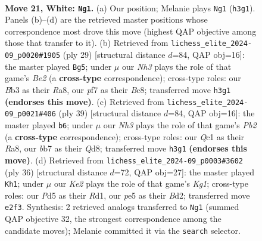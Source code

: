 \documentclass[11pt]{article}
\begin{document}
\begin{figure}[p]
\label{fig:thought-m38}
\end{figure}

\clearpage

\begin{figure}[p]\centering
\begin{subfigure}{0.46\textwidth}\centering
\resizebox{\linewidth}{!}{%
\newchessgame
\chessboard[
  setfen={2r3k1/1bqn1p1p/r4bp1/pppPp1B1/4P3/1BP3PN/P3KP1P/R1Q4R w - - 6 21},
  showmover=false,
  pgfstyle=straightmove, color=movearrow, markmove={h3-g1}
]}
\caption{}
\end{subfigure}\hfill
\begin{subfigure}{0.46\textwidth}\centering
\resizebox{\linewidth}{!}{%
\newchessgame
\chessboard[
  setfen={r1bq1rk1/1p2b1pn/2pp2pp/p7/P2PP1P1/2N1B2P/1PPQ2BK/R4R2 b - - 1 15},
  showmover=false,
  pgfstyle=straightmove, color=movearrow, markmove={e7-g5}
]}
\caption{}
\end{subfigure}
\\[4pt]
\begin{subfigure}{0.46\textwidth}\centering
\resizebox{\linewidth}{!}{%
\newchessgame
\chessboard[
  setfen={r2qrnk1/pp1b1pp1/2p4p/2N1PPb1/3pP3/3B3P/PPQ3PB/R4R1K b - - 3 20},
  showmover=false,
  pgfstyle=straightmove, color=movearrow, markmove={b7-b6}
]}
\caption{}
\end{subfigure}\hfill
\begin{subfigure}{0.46\textwidth}\centering
\resizebox{\linewidth}{!}{%
\newchessgame
\chessboard[
  setfen={1r3rk1/p2qbpp1/2p1b2p/2P1p2n/NPBpP3/5P2/P2BQ1PP/R2R2K1 w - - 0 19},
  showmover=false,
  pgfstyle=straightmove, color=movearrow, markmove={g1-h1}
]}
\caption{}
\end{subfigure}
\caption{\textbf{Move 21, White: \texttt{Ng1}.} (a) Our position; Melanie plays \texttt{Ng1} (\texttt{h3g1}). Panels (b)--(d) are the retrieved master positions whose correspondence most drove this move (highest QAP objective among those that transfer to it). (b) Retrieved from \texttt{lichess\_elite\_2024-09\_p0020\#1905} (ply 29) [structural distance $d$=84, QAP obj=16]: the master played \texttt{Bg5}; under $\mu$ our \emph{Nh3} plays the role of that game's \emph{Be2} (a \textbf{cross-type} correspondence); cross-type roles: our \emph{B}b3 as their \emph{R}a8, our \emph{p}f7 as their \emph{B}c8; transferred move \texttt{h3g1} \textbf{(endorses this move)}. (c) Retrieved from \texttt{lichess\_elite\_2024-09\_p0021\#406} (ply 39) [structural distance $d$=84, QAP obj=16]: the master played \texttt{b6}; under $\mu$ our \emph{Nh3} plays the role of that game's \emph{Pb2} (a \textbf{cross-type} correspondence); cross-type roles: our \emph{Q}c1 as their \emph{R}a8, our \emph{b}b7 as their \emph{Q}d8; transferred move \texttt{h3g1} \textbf{(endorses this move)}. (d) Retrieved from \texttt{lichess\_elite\_2024-09\_p0003\#3602} (ply 36) [structural distance $d$=72, QAP obj=27]: the master played \texttt{Kh1}; under $\mu$ our \emph{Ke2} plays the role of that game's \emph{Kg1}; cross-type roles: our \emph{P}d5 as their \emph{R}d1, our \emph{p}e5 as their \emph{B}d2; transferred move \texttt{e2f3}. Synthesis: 2 retrieved analogs transferred to \texttt{Ng1} (summed QAP objective 32, the strongest correspondence among the candidate moves); Melanie committed it via the \texttt{search} selector.}

\end{figure}
\end{document}
